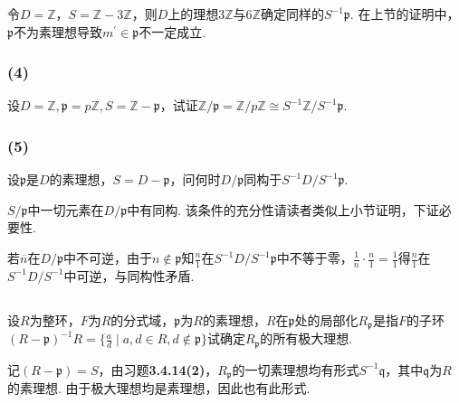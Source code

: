 \jie 令$D=\mathbb{Z}$，$S=\mathbb{Z}-3\mathbb{Z}$，则$D$上的理想$3\mathbb{Z}$与$6\mathbb{Z}$确定同样的$S^{-1}\mathfrak{p}$. 在上节的证明中，$\mathfrak{p}$不为素理想导致$m^{\prime}\in\mathfrak{p}$不一定成立.

\subsubsection{(4)}
设$D=\mathbb{Z}, \mathfrak{p}=p\mathbb{Z}, S=\mathbb{Z}-\mathfrak{p}$，试证$\mathbb{Z}/\mathfrak{p}=\mathbb{Z}/p\mathbb{Z}\cong S^{-1}\mathbb{Z}/S^{-1}\mathfrak{p}$.


\subsubsection{(5)}
设$\mathfrak{p}$是$D$的素理想，$S=D-\mathfrak{p}$，问何时$D/\mathfrak{p}$同构于$S^{-1}D/S^{-1}\mathfrak{p}$.

\jie $S/\mathfrak{p}$中一切元素在$D/\mathfrak{p}$中有同构. 该条件的充分性请读者类似上小节证明，下证必要性.

若$\overline{n}$在$D/\mathfrak{p}$中不可逆，由于$n\notin\mathfrak{p}$知$\frac{n}{1}$在$S^{-1}D/S^{-1}\mathfrak{p}$中不等于零，$\frac{1}{n}\cdot\frac{n}{1}=\frac{1}{1}$得$\frac{n}{1}$在$S^{-1}D/S^{-1}$中可逆，与同构性矛盾.

\subsection{}
设$R$为整环，$F$为$R$的分式域，$\mathfrak{p}$为$R$的素理想，$R$在$\mathfrak{p}$处的局部化$R_{\mathfrak{p}}$是指$F$的子环$(R-\mathfrak{p})^{-1}R=\{\frac{a}{d}\mid a,d\in R, d\notin\mathfrak{p}\}$试确定$R_{\mathfrak{p}}$的所有极大理想.

\jie 记$(R-\mathfrak{p})=S$，由{\heiti 习题}\textbf{3.4.14(2)}，$R_{\mathfrak{p}}$的一切素理想均有形式$S^{-1}\mathfrak{q}$，其中$\mathfrak{q}$为$R$的素理想. 由于极大理想均是素理想，因此也有此形式.

